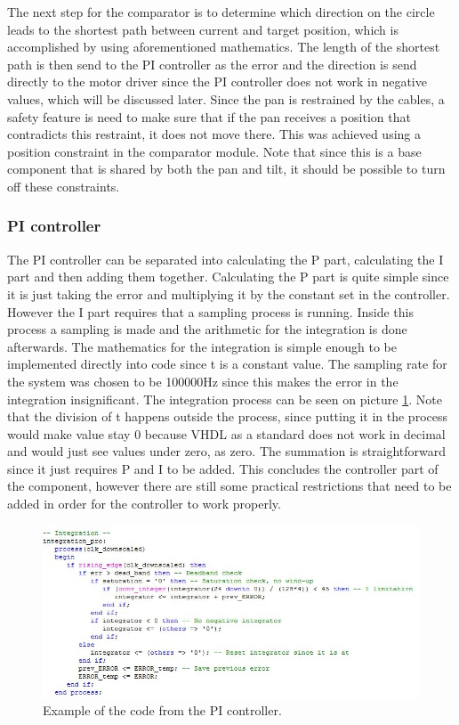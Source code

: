 The next step for the comparator is to determine which direction on the circle leads to the shortest path between current and target position, which is accomplished by using aforementioned mathematics. The length of the shortest path is then send to the PI controller as the error and the direction is send directly to the motor driver since the PI controller does not work in negative values, which will be discussed later.
Since the pan is restrained by the cables, a safety feature is need to make sure that if the pan receives a position that contradicts this restraint, it does not move there. This was achieved using a position constraint in the comparator module. Note that since this is a base component that is shared by both the pan and tilt, it should be possible to turn off these constraints.



\subsubsection{PI controller}

The PI controller can be separated into calculating the P part, calculating the I part and then adding them together. Calculating the P part is quite simple since it is just taking the error and multiplying it by the constant set in the controller. However the I part requires that a sampling process is running. Inside this process a sampling is made and the arithmetic for the integration is done afterwards. The mathematics for the integration is simple enough to be implemented directly into code since t is a constant value. The sampling rate for the system was chosen to be 100000Hz since this makes the error in the integration insignificant. The integration process can be seen on picture \ref{fig:PI controller code example}. Note that the division of t happens outside the process, since putting it in the process would make value stay 0 because VHDL as a standard does not work in decimal and would just see values under zero, as zero. The summation is straightforward since it just requires P and I to be added. This concludes the controller part of the component, however there are still some practical restrictions that need to be added in order for the controller to work properly.


\begin{figure}[h!]
\centering
\includegraphics[scale=0.7]{Billeder/FPGA/PI_controller_code_example.jpg}
\caption{Example of the code from the PI controller.}
\label{fig:PI controller code example}
\end{figure}


